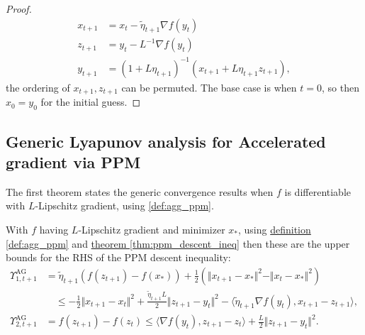 \documentclass[12pt]{article}
\begin{document}
\begin{proof}
            \begin{align*}
                x_{t + 1} &= x_t - \tilde \eta_{t + 1} \nabla f(y_t) 
                \\
                z_{t + 1} &= y_t - L^{-1} \nabla f(y_t) 
                \\
                y_{t + 1} &= 
                (1 + L\eta_{t + 1})^{-1}
                (
                x_{t + 1} + L\eta_{t + 1}z_{t + 1}
                ), 
            \end{align*}
            the ordering of $x_{t +1}, z_{t + 1}$ can be permuted. 
            The base case is when $t = 0$, so then $x_0 = y_0$ for the initial guess.
        \end{proof}

    \subsection{Generic Lyapunov analysis for Accelerated gradient via PPM}
        The first theorem states the generic convergence results when $f$ is differentiable with $L$-Lipschitz gradient, using \ref*{def:agg_ppm}. 
        \begin{lemma}\label{lemma:smooth_agg_lyapunov_upper_bound}
            With $f$ having $L$-Lipschitz gradient and minimizer $x_*$, using \hyperref[def:agg_ppm]{definition \ref*{def:agg_ppm}} and \hyperref[thm:ppm_descent_ineq]{theorem \ref*{thm:ppm_descent_ineq}} then these are the upper bounds for the RHS of the PPM descent inequality: 
            \begin{align*}
                \Upsilon_{1, t + 1}^{\text{AG}}&= \tilde \eta_{t + 1} (f(z_{t + 1}) - f(x_*))
                + \frac{1}{2}(
                    \Vert x_{t + 1} - x_*\Vert^2 - \Vert x_t - x_* \Vert^2
                )  
                \\
                & \quad \le 
                - \frac{1}{2}\Vert x_{t + 1} - x_t\Vert^2 + 
                \frac{\tilde \eta_{t + 1} L}{2}\Vert z_{t + 1} - y_t\Vert^2
                - 
                \langle \tilde \eta_{t + 1} \nabla f(y_t), x_{t + 1} - z_{t + 1} \rangle, 
                \\
                \Upsilon_{2, t + 1}^{\text{AG}} 
                &= f(z_{t + 1}) - f(z_t) 
                \le 
                \langle \nabla f(y_t), z_{t + 1} - z_t\rangle + 
                \frac{L}{2}\Vert z_{t + 1} - y_t\Vert^2. 
            \end{align*}
        \end{lemma}
\end{document}
